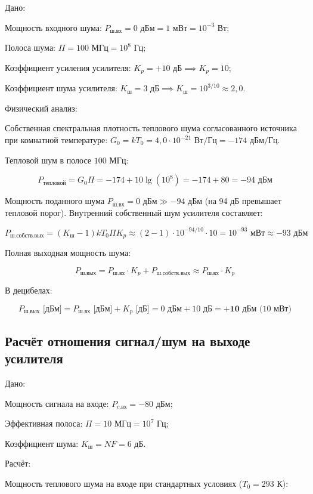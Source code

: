 Дано:

Мощность входного шума: $P_{\text{ш.вх}} = 0\text{ дБм} = 1\text{ мВт} = 10^{-3}\text{ Вт}$;

Полоса шума: $\Pi = 100\text{ МГц} = 10^8\text{ Гц}$;

Коэффициент усиления усилителя: $K_p = +10\text{ дБ} \implies K_p = 10$;

Коэффициент шума усилителя: $K_{\text{ш}} = 3\text{ дБ} \implies K_{\text{ш}} = 10^{3/10} \approx 2{,}0$.

Физический анализ:

Собственная спектральная плотность теплового шума согласованного источника при комнатной температуре: $G_0 = k T_0 = 4{,}0 \cdot 10^{-21}\text{ Вт/Гц} = -174\text{ дБм/Гц}$.

Тепловой шум в полосе $100\text{ МГц}$:


$$P_{\text{тепловой}} = G_0 \Pi = -174 + 10\lg(10^8) = -174 + 80 = -94\text{ дБм}$$

Мощность поданного шума $P_{\text{ш.вх}} = 0\text{ дБм} \gg -94\text{ дБм}$ (на 94 дБ превышает тепловой порог). Внутренний собственный шум усилителя составляет:


$$P_{\text{ш.собств.вых}} = (K_{\text{ш}} - 1) k T_0 \Pi K_p \approx (2 - 1) \cdot 10^{-94/10} \cdot 10 = 10^{-93}\text{ мВт} \approx -93\text{ дБм}$$

Полная выходная мощность шума:


$$P_{\text{ш.вых}} = P_{\text{ш.вх}} \cdot K_p + P_{\text{ш.собств.вых}} \approx P_{\text{ш.вх}} \cdot K_p$$


В децибелах:


$$P_{\text{ш.вых}}\text{ [дБм]} = P_{\text{ш.вх}}\text{ [дБм]} + K_p\text{ [дБ]} = 0\text{ дБм} + 10\text{ дБ} = \mathbf{+10\text{ дБм}}\text{ (10 мВт)}$$

\subsection {Расчёт отношения сигнал/шум на выходе усилителя}

Дано:

Мощность сигнала на входе: $P_{c.\text{вх}} = -80\text{ дБм}$;

Эффективная полоса: $\Pi = 10\text{ МГц} = 10^7\text{ Гц}$;

Коэффициент шума: $K_{\text{ш}} = NF = 6\text{ дБ}$.

Расчёт:

Мощность теплового шума на входе при стандартных условиях ($T_0 = 293\text{ К}$):


